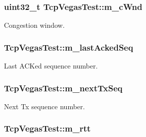 \subsubsection[{\texorpdfstring{m\+\_\+c\+Wnd}{m_cWnd}}]{\setlength{\rightskip}{0pt plus 5cm}uint32\+\_\+t Tcp\+Vegas\+Test\+::m\+\_\+c\+Wnd\hspace{0.3cm}{\ttfamily [private]}}\hypertarget{classTcpVegasTest_a60f99e3ccb08c3ebfd7e7de6896ec2be}{}\label{classTcpVegasTest_a60f99e3ccb08c3ebfd7e7de6896ec2be}


Congestion window. 

\subsubsection[{\texorpdfstring{m\+\_\+last\+Acked\+Seq}{m_lastAckedSeq}}]{ Tcp\+Vegas\+Test\+::m\+\_\+last\+Acked\+Seq\hspace{0.3cm}{\ttfamily [private]}}\hypertarget{classTcpVegasTest_a46a6d79986d938af919528268e3fb99e}{}\label{classTcpVegasTest_a46a6d79986d938af919528268e3fb99e}


Last A\+C\+Ked sequence number. 

\subsubsection[{\texorpdfstring{m\+\_\+next\+Tx\+Seq}{m_nextTxSeq}}]{ Tcp\+Vegas\+Test\+::m\+\_\+next\+Tx\+Seq\hspace{0.3cm}{\ttfamily [private]}}\hypertarget{classTcpVegasTest_a861be20b91b8b676667d33a15bc4632d}{}\label{classTcpVegasTest_a861be20b91b8b676667d33a15bc4632d}


Next Tx sequence number. 

\subsubsection[{\texorpdfstring{m\+\_\+rtt}{m_rtt}}]{ Tcp\+Vegas\+Test\+::m\+\_\+rtt\hspace{0.3cm}{\ttfamily [private]}}\hypertarget{classTcpVegasTest_aea88a087919c8ad57ea580fb684996b4}{}\label{classTcpVegasTest_aea88a087919c8ad57ea580fb684996b4}


